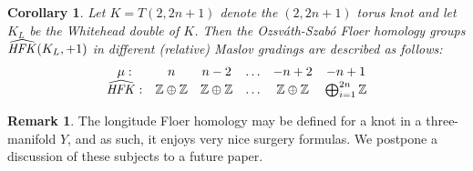 \documentclass{gtart_h}
\newtheorem{cor}[thm]{Corollary}
\theoremstyle{definition}
\newtheorem{remark}[thm]{Remark}
\newcommand\HFK{\text{\it HFK\/}}
\newcommand{\Z}{\mathbb{Z}}
\begin{document}
\begin{cor}{ Let $K=T(2,2n+1)$ denote the $(2,2n+1)$ torus knot and
let $K_L$ be the Whitehead double of $K$. Then the Ozsv\'ath-Szab\'o Floer homology groups
$\widehat{\HFK}(K_L,+1)$ in different (relative) Maslov gradings are described as follows:
\begin{displaymath}
\begin{array}{cccccc}
\mu: & n& n-2 & \ldots & -n+2 &-n+1\\
\widehat{\HFK}:&
\Z\oplus \Z& \Z \oplus \Z &\ldots & \Z\oplus \Z & \bigoplus_{i=1}^{2n}\Z\\
\end{array}
\end{displaymath}
}\end{cor}



\begin{remark}
The longitude Floer homology may be defined for a knot in a
three-manifold $Y$, and as such, it enjoys very nice surgery formulas.
We postpone a discussion of these subjects to a future paper.
\end{remark}
\end{document}
